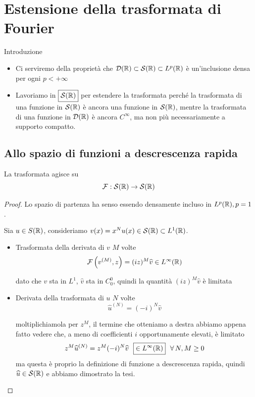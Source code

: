 \section{Estensione della trasformata di Fourier}

Introduzione
\begin{itemize}
\item Ci serviremo della proprietà che $\mathcal{D}(\mathbb{R}) \subset \mathcal{S}(\mathbb{R}) \subset L^{p}(\mathbb{R})$ è un'inclusione densa per ogni $p < + \infty $
\item Lavoriamo in $\boxed{\mathcal{S}(\mathbb{R})}$ per estendere la trasformata perché la trasformata di una funzione in $\mathcal{S}(\mathbb{R})$ è ancora una funzione in $\mathcal{S}(\mathbb{R})$, mentre la trasformata di una funzione in $\mathcal{D}(\mathbb{R})$ è ancora $C^{\infty}$, ma non più necessariamente a supporto compatto.
\end{itemize}

\subsection{Allo spazio di funzioni a descrescenza rapida}

\begin{thm}
La trasformata agisce su
\begin{equation*}
\mathcal{F} : \mathcal{S}(\mathbb{R})\rightarrow \mathcal{S}(\mathbb{R})
\end{equation*}
\end{thm}
\begin{proof}

Lo spazio di partenza ha senso essendo densamente incluso in $L^{p}(\mathbb{R}), p = 1$.

Sia $u\in S(\mathbb{R})$, consideriamo $v(x) = x^{N} u(x) \in \mathcal{S}(\mathbb{R}) \subset L^{1}(\mathbb{R})$.
\begin{itemize}
\item Trasformata della derivata di $v$ $M$ volte
\begin{equation*}
\mathcal{F}\left(v^{(M)}, z\right) = (iz)^{M}\widehat{v} \in L^{\infty}(\mathbb{R})
\end{equation*}

dato che $v$ sta in $L^{1}$, $\hat{v}$ sta in $C^{0}_{0}$, quindi la quantità $(iz)^{M}\hat{v}$ è limitata
\item Derivata della trasformata di $u$ $N$ volte
\begin{equation*}
\hat{u}^{(N)} = (- i)^{N}\hat{v}
\end{equation*}

moltiplichiamola per $z^{M}$, il termine che otteniamo a destra abbiamo appena fatto vedere che, a meno di coefficienti $i$ opportunamente elevati, è limitato
\begin{equation*}
z^{M}\hat{u}^{(N)} = z^{M}(- i)^{N}\hat{v} \ \ \boxed{\in L^{\infty}(\RR)} \ \ \forall N, M \geq 0
\end{equation*}ma questa è proprio la definizione di funzione a descrescenza rapida, quindi $\widehat{u} \in \mathcal{S}(\mathbb{R})$ e abbiamo dimostrato la tesi.
\end{itemize}
\end{proof}

